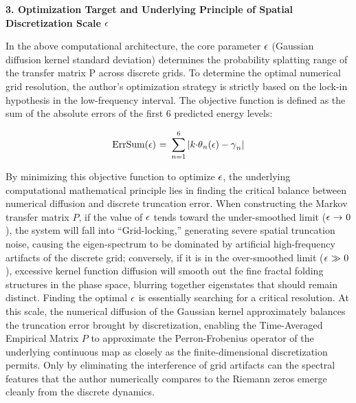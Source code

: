 \documentclass[mca,article,submit,oneauthor,pdftex]{Definitions/mdpi}
\begin{document}
\textbf{3. Optimization Target and Underlying Principle of Spatial
Discretization Scale} \(\text{\ensuremath{\epsilon}}\)

In the above computational architecture, the core parameter \(\text{\ensuremath{\epsilon}}\)
(Gaussian diffusion kernel standard deviation) determines the
probability splatting range of the transfer matrix \(\text{P}\) across
discrete grids. To determine the optimal numerical grid resolution, the author's
optimization strategy is strictly based on the lock-in hypothesis in the
low-frequency interval. The objective function is defined as the sum of
the absolute errors of the first 6 predicted energy levels:

\begin{equation}
\text{ErrSum(\ensuremath{\epsilon}) = }\sum_{n=1}^{\text{6}}\text{|}{k}\text{\ensuremath{\cdot}}\text{\ensuremath{\theta}}_{{n}}\text{(\ensuremath{\epsilon})}-\text{\ensuremath{\gamma}}_{{n}}\text{|}
\end{equation}

By minimizing this objective function to optimize \(\text{\ensuremath{\epsilon}}\), the
underlying computational mathematical principle lies in finding the
critical balance between numerical diffusion and discrete truncation
error. When constructing the Markov transfer matrix \({P}\), if the
value of \(\text{\ensuremath{\epsilon}}\) tends toward the under-smoothed limit
(\(\text{\ensuremath{\epsilon}~\ensuremath{\rightarrow}~0}\)), the system will fall into ``Grid-locking,'' generating
severe spatial truncation noise, causing the eigen-spectrum to be
dominated by artificial high-frequency artifacts of the discrete grid;
conversely, if it is in the over-smoothed limit (\(\text{\ensuremath{\epsilon}~\ensuremath{\gg}~0}\)),
excessive kernel function diffusion will smooth out the fine fractal
folding structures in the phase space, blurring together eigenstates that
should remain distinct. Finding the optimal \(\text{\ensuremath{\epsilon}}\) is essentially searching
for a critical resolution. At this scale, the numerical diffusion of the
Gaussian kernel approximately balances the truncation error brought by
discretization, enabling the Time-Averaged Empirical Matrix \({P}\)
to approximate the Perron-Frobenius operator of the underlying continuous
map as closely as the finite-dimensional discretization permits. Only by
eliminating the interference
of grid artifacts can the spectral features that the author numerically compares to
the Riemann zeros emerge cleanly from the discrete dynamics.
\end{document}
